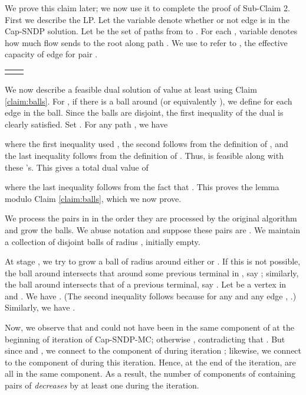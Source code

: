 \documentclass[11pt]{article}
\newcounter{thm0Rcopies}
\newcounter{thm_saved}
\renewenvironment{proof}{\vspace{-0.1in}\noindent{\bf Proof:}}{\hspace*{\fill}\par}
\newenvironment{proofof}[1]{\smallskip\noindent{\bf Proof of #1:}}{\hspace*{\fill}\par}
\begin{document}
\begin{proof}
  We prove this claim later; we now use it to complete the proof of
  Sub-Claim 2.  First we describe the LP.  Let the variable 
  denote whether or not edge  is in the Cap-SNDP solution. Let
   be the set of paths from  to . For each , variable  denotes how much flow  sends to the root
  along path . We use  to refer to , the
  effective capacity of edge  for pair .

  \begin{tabular}{c|l}
    \begin{minipage}[htb]{0.45\linewidth}
      
    \end{minipage}
    &
    \begin{minipage}[htb]{0.45\linewidth}
      
    \end{minipage}
  \end{tabular}


  We now describe a feasible dual solution of value at least 
  using Claim \ref{claim:balls}. 
For , if there is a ball  around  (or
  equivalently ), we define  for each
  edge in the ball. Since the balls are disjoint, the first inequality
  of the dual is clearly satisfied.  Set . For
  any path , we have
  

\noindent
  where the first inequality used , the second follows
  from the definition of , and the last inequality follows
  from the definition of . Thus,  is feasible along with these 's. This gives
  a total dual value of

  
  where the last inequality follows from the fact that . This proves the lemma modulo Claim \ref{claim:balls}, which we
  now prove.

  \begin{proofof}{Claim \ref{claim:balls}}
    We process the pairs in  in the order they are processed by
    the original algorithm and grow the balls.  We abuse notation and
    suppose these pairs are . We maintain
    a collection of disjoint balls of radius , initially
    empty.

    At stage , we try to grow a ball of radius  around either
     or . If this is not possible, the ball around 
    intersects that around some previous terminal in , say
    ; similarly, the ball around  intersects that of a
    previous terminal, say .  Let  be a vertex in
     and . We have . (The second inequality follows because for any  and
    any edge , .) Similarly, we have .

    Now, we observe that  and  could not have been in the
    same component of  at the beginning of iteration  of {\sc
      Cap-SNDP-MC}; otherwise , contradicting that . But
    since  and , we
    connect  to the component of  during iteration ;
    likewise, we connect  to the component of  during
    this iteration. Hence, at the end of the iteration,  are all in the same component. As a result, the
    number of components of  containing pairs of 
    \emph{decreases} by at least one during the iteration.


\end{proofof}
\end{proof}
\end{document}
